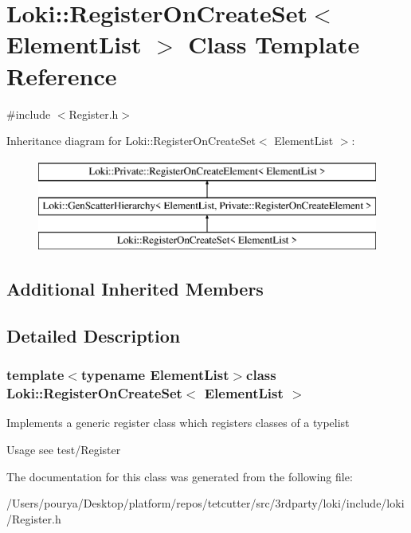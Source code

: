 \hypertarget{structLoki_1_1RegisterOnCreateSet}{}\section{Loki\+:\+:Register\+On\+Create\+Set$<$ Element\+List $>$ Class Template Reference}
\label{structLoki_1_1RegisterOnCreateSet}


{\ttfamily \#include $<$Register.\+h$>$}

Inheritance diagram for Loki\+:\+:Register\+On\+Create\+Set$<$ Element\+List $>$\+:\begin{figure}[H]
\begin{center}
\leavevmode
\includegraphics[height=3.000000cm]{structLoki_1_1RegisterOnCreateSet}
\end{center}
\end{figure}
\subsection*{Additional Inherited Members}


\subsection{Detailed Description}
\subsubsection*{template$<$typename Element\+List$>$class Loki\+::\+Register\+On\+Create\+Set$<$ Element\+List $>$}

Implements a generic register class which registers classes of a typelist

\begin{DoxyParagraph}{Usage}
see test/\+Register 
\end{DoxyParagraph}


The documentation for this class was generated from the following file\+:\begin{DoxyCompactItemize}
\item 
/\+Users/pourya/\+Desktop/platform/repos/tetcutter/src/3rdparty/loki/include/loki/Register.\+h\end{DoxyCompactItemize}
